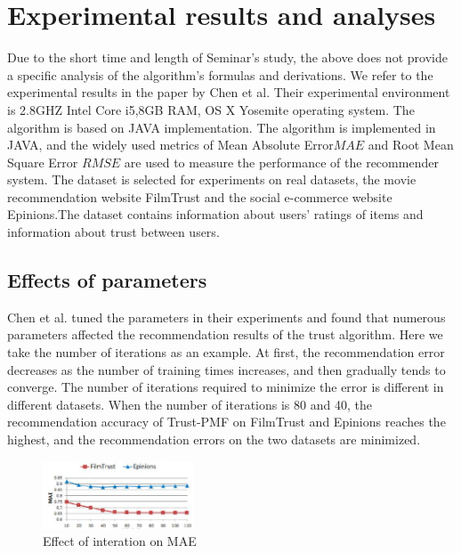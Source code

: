 \section{Experimental results and analyses}
Due to the short time and length of Seminar's study, the above does not provide a specific 
analysis of the algorithm's formulas and derivations. We refer to the experimental 
results in the paper by Chen et al.\cite{b15} Their experimental environment is 2.8GHZ Intel Core 
i5,8GB RAM, OS X Yosemite operating system. The algorithm is based on JAVA implementation. 
The algorithm is implemented in JAVA, and the widely used metrics of Mean Absolute Error$MAE$ 
and Root Mean Square Error $RMSE$ are used to measure the performance of the recommender 
system. The dataset is selected for experiments on real datasets, the movie recommendation 
website FilmTrust and the social e-commerce website Epinions.The dataset contains 
information about users' ratings of items and information about trust between users\cite{b24}.

\subsection{Effects of parameters}
Chen et al.\cite{b15} tuned the parameters in their experiments and found that numerous parameters 
affected the recommendation results of the trust algorithm. Here we take the number 
of iterations as an example. At first, the recommendation error decreases as the number 
of training times increases, and then gradually tends to converge\cite{b23, b25}. The number of iterations 
required to minimize the error is different in different datasets. When the number of 
iterations is 80 and 40, the recommendation accuracy of Trust-PMF on FilmTrust and Epinions 
reaches the highest, and the recommendation errors on the two datasets are minimized\cite{b21}.

\begin{figure}[H] %
    \centering %
    \includegraphics[width=0.4\textwidth]{figures/parameter1.png} %
    \caption{Effect of interation on MAE} %
    \label{Fig.2: Effect of interation on MAE} %
    \end{figure}
 \\

